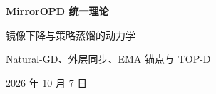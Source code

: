\documentclass[lang=cn,scheme=chinese,thmcnt=chapter,device=normal]{elegantbook}
\newcommand{\1}{\mathbf{1}}
\begin{document}
\frontmatter
\begin{titlepage}
\vspace*{0.18\textheight}
\begin{center}
{\bfseries\Huge MirrorOPD 统一理论}\par\vspace{1ex}
{\Large 镜像下降与策略蒸馏的动力学}\par\vspace{3ex}
{\large Natural-GD、外层同步、EMA 锚点与 TOP-D}\par\vspace{6ex}
{\large 2026 年 10 月 7 日}
\end{center}
\end{titlepage}
\tableofcontents
\mainmatter










\printbibliography[heading=bibintoc,title={参考文献}]
\end{document}
